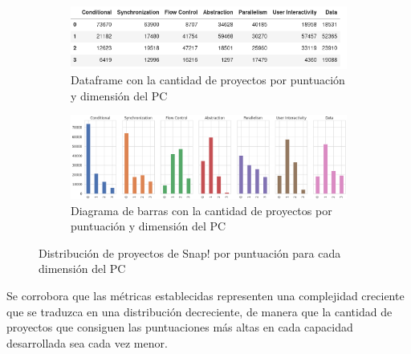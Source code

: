 \documentclass[a4paper, 12pt]{book}
\begin{document}
\begin{figure}[H]
    \centering      
    \begin{subfigure}[h]{1\textwidth} 
        \includegraphics[width=\textwidth]{img/df_PC_Snap.png}
        \caption{Dataframe con la cantidad de proyectos por puntuación y dimensión del PC}
        \label{fig:df_PC_Snap}
    \end{subfigure}
    \begin{subfigure}[h]{1\textwidth} 
        \includegraphics[width=\textwidth]{img/distribution_PC_Snap.png}
        \caption{Diagrama de barras con la cantidad de proyectos por puntuación y dimensión del PC}
        \label{fig:barras_PC_Snap}
    \end{subfigure} 
\caption{Distribución de proyectos de Snap! por puntuación para cada dimensión del PC}
\end{figure}
Se corrobora que las métricas establecidas representen una complejidad creciente que se traduzca en una distribución decreciente, de manera que la cantidad de proyectos que consiguen las puntuaciones más altas en cada capacidad desarrollada sea cada vez menor.   
\end{document}
